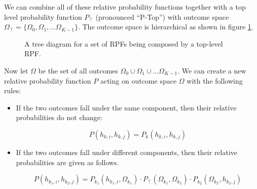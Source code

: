 \documentclass[twoside]{article}
\newcommand{\quotes}[1]{``#1''}
\theoremstyle{plain}%
\theoremstyle{definition}
\theoremstyle{remark}
\begin{document}
We can combine all of these relative probability functions together with a top level probability function \(P_\top\) (pronounced \quotes{P-Top}) with outcome space \(\Omega_\top = \{\Omega_0, \Omega_1, ... \Omega_{K- 1}\}\). The outcome space is hierarchical as shown in figure \ref{fig:compose_rpfs}.

\begin{figure}[h]
\caption{A tree diagram for a set of RPFs being composed by a top-level RPF.}
\label{fig:compose_rpfs}
\end{figure}

Now let \(\Omega\) be the set of all outcomes \(\Omega_0 \cup \Omega_1 \cup \dots \Omega_{K-1}\). We can create a new relative probability function \(P\) acting on outcome space \(\Omega\) with the following rules:

\begin{itemize}
\item If the two outcomes fall under the same component, then their relative probabilities do not change:

\begin{equation}
\label{rpf_composition_same_branch}
P(h_{k, i}, h_{k, j}) = P_k(h_{k, i}, h_{k, j})
\end{equation}

\item If the two outcomes fall under different components, then their relative probabilities are given as follows.

\begin{equation}
\label{eq:rpf_composition_different_branch}
P(h_{k_1, i}, h_{k_2, j}) = P_{k_1}(h_{k_1, i}, \Omega_{k_1}) \cdot  P_{\top}(\Omega_{k_1}, \Omega_{k_2}) \cdot P_{k_2}(\Omega_{k_2}, h_{k_2, j})
\end{equation}
\end{itemize}
\end{document}
